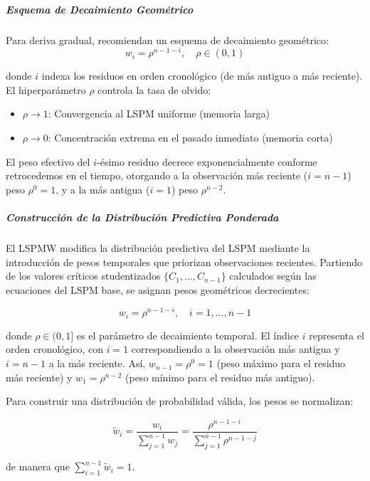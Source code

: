 \subparagraph{Esquema de Decaimiento Geométrico}
Para deriva gradual, \textcite{Barber2023} recomiendan un esquema de decaimiento geométrico:
\begin{equation}
w_i = \rho^{n-1-i}, \quad \rho \in (0, 1)
\end{equation}

donde $i$ indexa los residuos en orden cronológico (de más antiguo a más reciente). El hiperparámetro $\rho$ controla la tasa de olvido:
\begin{itemize}
    \item $\rho \to 1$: Convergencia al LSPM uniforme (memoria larga)
    \item $\rho \to 0$: Concentración extrema en el pasado inmediato (memoria corta)
\end{itemize}

El peso efectivo del $i$-ésimo residuo decrece exponencialmente conforme retrocedemos en el tiempo, otorgando a la observación más reciente ($i = n-1$) peso $\rho^0 = 1$, y a la más antigua ($i = 1$) peso $\rho^{n-2}$.


\subparagraph{Construcción de la Distribución Predictiva Ponderada}

El LSPMW modifica la distribución predictiva del LSPM mediante la introducción de pesos temporales que priorizan observaciones recientes. Partiendo de los valores críticos studentizados $\{C_1, \ldots, C_{n-1}\}$ calculados según las ecuaciones del LSPM base, se asignan pesos geométricos decrecientes:

\begin{equation}
w_i = \rho^{n-1-i}, \quad i = 1, \ldots, n-1
\label{eq:lspmw_raw_weights}
\end{equation}

donde $\rho \in (0, 1]$ es el parámetro de decaimiento temporal. El índice $i$ representa el orden cronológico, con $i=1$ correspondiendo a la observación más antigua y $i=n-1$ a la más reciente. Así, $w_{n-1} = \rho^0 = 1$ (peso máximo para el residuo más reciente) y $w_1 = \rho^{n-2}$ (peso mínimo para el residuo más antiguo).

Para construir una distribución de probabilidad válida, los pesos se normalizan:

\begin{equation}
\tilde{w}_i = \frac{w_i}{\sum_{j=1}^{n-1} w_j} = \frac{\rho^{n-1-i}}{\sum_{j=1}^{n-1} \rho^{n-1-j}}
\label{eq:lspmw_normalized_weights}
\end{equation}

de manera que $\sum_{i=1}^{n-1} \tilde{w}_i = 1$.

